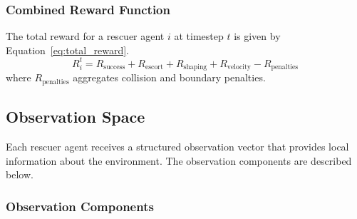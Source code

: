 \documentclass[11pt,a4paper]{article}
\begin{document}
\subsubsection{Combined Reward Function}
\label{subsubsec:combined_reward}

The total reward for a rescuer agent $i$ at timestep $t$ is given by Equation~\ref{eq:total_reward}.
\begin{equation}
\label{eq:total_reward}
R_i^t = R_{\text{success}} + R_{\text{escort}} + R_{\text{shaping}} + R_{\text{velocity}} - R_{\text{penalties}}
\end{equation}
where $R_{\text{penalties}}$ aggregates collision and boundary penalties.

\subsection{Observation Space}
\label{subsec:observation_space}

Each rescuer agent receives a structured observation vector that provides local information about the environment.
The observation components are described below.

\subsubsection{Observation Components}
\label{subsubsec:obs_components}
\end{document}
